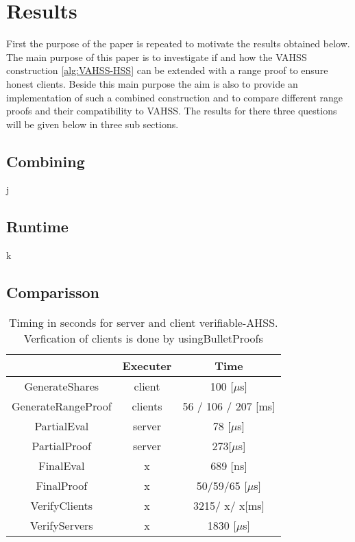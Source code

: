 \chapter{Results}
\label{ch:results}

First the purpose of the paper is repeated to motivate the results obtained below. The main purpose of this paper is to investigate if  and how the VAHSS construction \ref{alg:VAHSS-HSS} can be extended with a range proof to ensure honest clients. Beside this main purpose the aim is also to provide an implementation of such a combined construction and to compare different range proofs and their compatibility to VAHSS. The results for there three questions will be given below in three sub sections. 

\section{Combining}
j
\section{Runtime}
k
\section{Comparisson}

\begin{table}
\label{tab:BenchBP}
\caption{Timing in seconds for server and client verifiable-AHSS. Verfication of clients is done by usingBulletProofs}
\centering
\begin{tabular}{*{3}{c}}
\hline
    										&  \textbf{Executer}   & \textbf{Time}    		\\ \hline
  GenerateShares 				&  client  					&   100 [$\mu$s]																	\\ \hline 
  GenerateRangeProof  		&  clients  					&   56 /	106 /  207 [ms]												\\ \hline 
  PartialEval  						&  server  					&   78	[$\mu$s]																\\ \hline 
  PartialProof 					&  server 					&   273[$\mu$s]														\\ \hline 
  FinalEval  						&  x  							&   689 [ns]					 													\\ \hline 
  FinalProof  						&  x 							&   50/59/65	[$\mu$s]																\\ \hline 
  VerifyClients 					&  x 							&   3215/ x/ x[ms]																	\\ \hline 
  VerifyServers					&  x 							&   1830 [$\mu$s]															\\ \hline 
\end{tabular}
 \end{table}